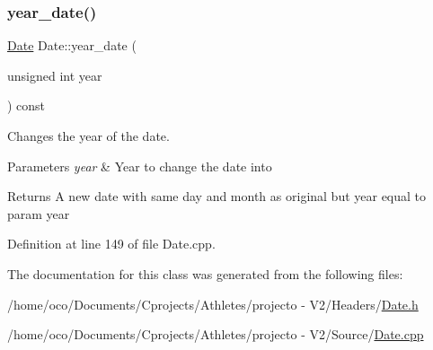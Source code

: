 \hypertarget{class_date_a0ec9ecc48a4e5a4a582ff8344ae51acb}{}\label{class_date_a0ec9ecc48a4e5a4a582ff8344ae51acb} 
\subsubsection{\texorpdfstring{year\+\_\+date()}{year\_date()}}
{\footnotesize\ttfamily \hyperlink{class_date}{Date} Date\+::year\+\_\+date (\begin{DoxyParamCaption}\item[{unsigned int}]{year }\end{DoxyParamCaption}) const}



Changes the year of the date. 


\begin{DoxyParams}{Parameters}
{\em year} & Year to change the date into \\
\hline
\end{DoxyParams}
\begin{DoxyReturn}{Returns}
A new date with same day and month as original but year equal to param year 
\end{DoxyReturn}


Definition at line 149 of file Date.\+cpp.



The documentation for this class was generated from the following files\+:\begin{DoxyCompactItemize}
\item 
/home/oco/\+Documents/\+Cprojects/\+Athletes/projecto -\/ V2/\+Headers/\hyperlink{_date_8h}{Date.\+h}\item 
/home/oco/\+Documents/\+Cprojects/\+Athletes/projecto -\/ V2/\+Source/\hyperlink{_date_8cpp}{Date.\+cpp}\end{DoxyCompactItemize}
